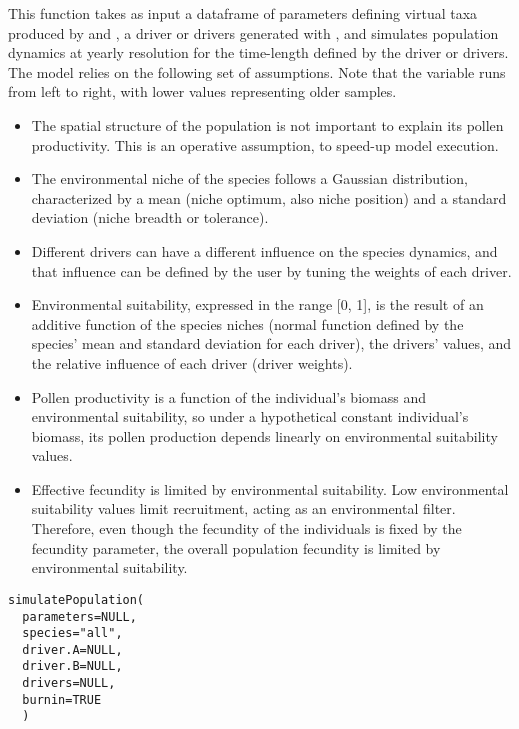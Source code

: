 \documentclass[letterpaper]{book}
\begin{document}
\begin{Description}\relax
This function takes as input a dataframe of parameters defining virtual taxa produced by  and , a driver or drivers generated with , and simulates population dynamics at yearly resolution for the time-length defined by the driver or drivers. The model relies on the following set of assumptions. Note that the variable  runs from left to right, with lower values representing older samples.

\begin{itemize}

\item  The spatial structure of the population is not important to explain its pollen productivity. This is an operative assumption, to speed-up model execution.
\item  The environmental niche of the species follows a Gaussian distribution, characterized by a mean (niche optimum, also niche position) and a standard deviation (niche breadth or tolerance).
\item  Different drivers can have a different influence on the species dynamics, and that influence can be defined by the user by tuning the weights of each driver.
\item  Environmental suitability, expressed in the range [0, 1], is the result of an additive function of the species niches (normal function defined by the species' mean and standard deviation for each driver), the drivers' values, and the relative influence of each driver (driver weights).
\item  Pollen productivity is a function of the individual's biomass and environmental suitability, so under a hypothetical constant individual's biomass, its pollen production depends linearly on environmental suitability values.
\item  Effective fecundity is limited by environmental suitability. Low environmental suitability values limit recruitment, acting as an environmental filter. Therefore, even though the fecundity of the individuals is fixed by the fecundity parameter, the overall population fecundity is limited by environmental suitability.

\end{itemize}

\end{Description}
%
\begin{Usage}
\begin{verbatim}
simulatePopulation(
  parameters=NULL,
  species="all",
  driver.A=NULL,
  driver.B=NULL,
  drivers=NULL,
  burnin=TRUE
  )
\end{verbatim}
\end{Usage}
\end{document}
